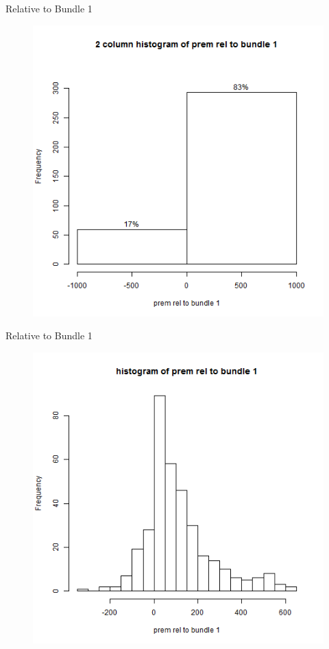 \documentclass[xcolor=dvipsnames,11pt]{beamer}
\theoremstyle{definition}
\begin{document}
\begin{frame}{Relative to Bundle 1}
\begin{figure}

\includegraphics[scale=0.43]{rel1_3_histogram_of_prem_rel_to_bundle_1_2_col}
\end{figure}
\end{frame}

\begin{frame}{Relative to Bundle 1}
\begin{figure}

\includegraphics[scale=0.43]{rel1_4_histogram_of_prem_rel_to_bundle_1}
\end{figure}
\end{frame}
\end{document}
